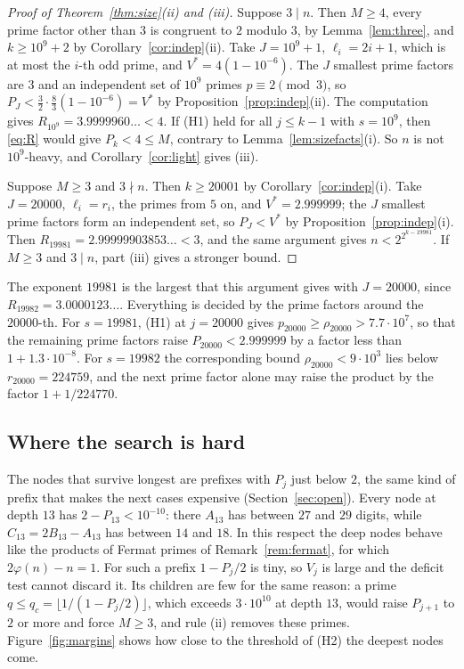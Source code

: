 \documentclass[11pt,reqno]{amsart}
\numberwithin{equation}{section}
\theoremstyle{plain}
\theoremstyle{definition}
\theoremstyle{remark}
\begin{document}
\begin{proof}[Proof of Theorem~\textup{\ref{thm:size}(ii)} and
\textup{(iii)}]
Suppose $3\mid n$. Then $M\ge4$, every prime factor other than $3$ is
congruent to $2$ modulo $3$, by Lemma~\ref{lem:three}, and
$k\ge10^9+2$ by Corollary~\ref{cor:indep}(ii). Take $J=10^9+1$,
$\ell_i=2i+1$, which is at most the $i$-th odd prime, and
$V^*=4(1-10^{-6})$. The $J$ smallest prime factors are $3$ and an
independent set of $10^9$ primes $p\equiv2\pmod3$, so
$P_J<\frac32\cdot\frac83(1-10^{-6})=V^*$ by
Proposition~\ref{prop:indep}(ii). The computation gives
$R_{10^9}=3.9999960\ldots<4$. If (H1) held for all $j\le k-1$ with
$s=10^9$, then \eqref{eq:R} would give $P_k<4\le M$, contrary to
Lemma~\ref{lem:sizefacts}(i). So $n$ is not $10^9$-heavy, and
Corollary~\ref{cor:light} gives (iii).

Suppose $M\ge3$ and $3\nmid n$. Then $k\ge20001$ by
Corollary~\ref{cor:indep}(i). Take $J=20000$, $\ell_i=r_i$, the primes
from $5$ on, and $V^*=2.999999$; the $J$ smallest prime factors form an
independent set, so $P_J<V^*$ by Proposition~\ref{prop:indep}(i).
Then $R_{19981}=2.99999903853\ldots<3$, and the same argument gives
$n<2^{2^{k-19981}}$. If $M\ge3$ and $3\mid n$, part (iii) gives a
stronger bound.
\end{proof}

The exponent $19981$ is the largest that this argument gives with
$J=20000$, since $R_{19982}=3.0000123\ldots$. Everything is decided by
the prime factors around the $20000$-th. For $s=19981$, (H1) at
$j=20000$ gives $p_{20000}\ge\rho_{20000}>7.7\cdot10^7$, so that the
remaining prime factors raise $P_{20000}<2.999999$ by a factor less
than $1+1.3\cdot10^{-8}$. For $s=19982$ the corresponding bound
$\rho_{20000}<9\cdot10^3$ lies below $r_{20000}=224759$, and the next prime
factor alone may raise the product by the factor $1+1/224770$.

\subsection{Where the search is hard}\label{sec:hard}
The nodes that survive longest are prefixes with $P_j$ just below $2$,
the same kind of prefix that makes the next cases expensive
(Section~\ref{sec:open}). Every node at depth $13$ has
$2-P_{13}<10^{-10}$: there $A_{13}$ has between $27$ and $29$ digits,
while $C_{13}=2B_{13}-A_{13}$ has between $14$ and $18$. In this
respect the deep nodes behave like the products of Fermat primes of
Remark~\ref{rem:fermat}, for which $2\varphi(n)-n=1$. For such a
prefix $1-P_j/2$ is tiny, so $V_j$ is large and the deficit test
cannot discard it. Its children are few for the same reason: a prime
$q\le q_c=\lfloor1/(1-P_j/2)\rfloor$, which exceeds $3\cdot10^{10}$ at
depth $13$, would raise $P_{j+1}$ to $2$ or more and force $M\ge3$, and
rule (ii) removes these primes. Figure~\ref{fig:margins} shows how
close to the threshold of (H2) the deepest nodes come.
\end{document}
